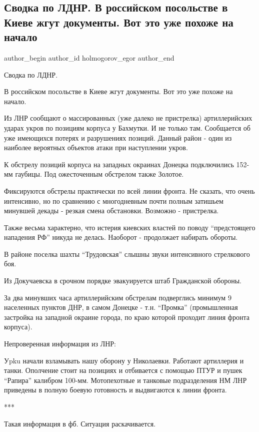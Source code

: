  
 
 
 
 
 
\subsection{Сводка по ЛДНР. В российском посольстве в Киеве жгут документы. Вот это уже похоже на начало}
\label{sec:17_02_2022.tg.holmogorov_egor.1.svodka_po_ldnr}
 
\ifcmt
 author_begin
   author_id holmogorov_egor
 author_end
\fi

Сводка по ЛДНР.

В российском посольстве в Киеве жгут документы. Вот это уже похоже на начало.

Из ЛНР сообщают о массированных (уже далеко не пристрелка) артиллерийских
ударах укров по позициям корпуса у Бахмутки. И не только там. Сообщается об уже
имеющихся потерях и разрушениях позиций. Данный район - один из наиболее
вероятных объектов атаки при наступлении укров.

К обстрелу позиций корпуса на западных окраинах Донецка подключились 152-мм
гаубицы. Под ожесточенным обстрелом также Золотое.

Фиксируются обстрелы практически по всей линии фронта. Не сказать, что очень
интенсивно, но по сравнению с многодневным почти полным затишьем минувшей
декады - резкая смена обстановки. Возможно - пристрелка.

Также весьма характерно, что истерия киевских властей по поводу \enquote{предстоящего
нападения РФ} никуда не делась. Наоборот - продолжает набирать обороты.

В районе поселка шахты \enquote{Трудовская} слышны звуки интенсивного стрелкового боя.

Из Докучаевска в срочном порядке эвакуируется штаб Гражданской обороны.

За два минувших часа артиллерийским обстрелам подверглись минимум 9 населенных
пунктов ДНР, в самом Донецке - т.н. \enquote{Промка} (промышленная застройка на
западной окраине города, по краю которой проходит линия фронта корпуса).

Непроверенная информация из ЛНР:

Уpku начали взламывать нашу оборону у Николаевки. Работают артиллерия и танки.
Ополчение стоит на позициях и отбивается с помощью ПТУР и пушек \enquote{Рапира}
калибром 100-мм. Мотопехотные и танковые подразделения НМ ЛНР приведены в
полную боевую готовность и выдвигаются к линии фронта.

***

Такая информация в фб. Ситуация раскачивается.
